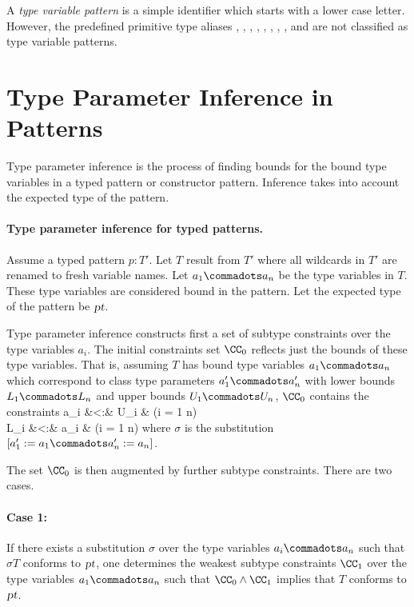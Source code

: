A {\em type variable pattern} is a simple identifier which starts with
a lower case letter. However, the predefined primitive type aliases
\lstinline@unit@, \lstinline@boolean@, \lstinline@byte@,
\lstinline@short@, \lstinline@char@, \lstinline@int@,
\lstinline@long@, \lstinline@float@, and \lstinline@double@ are not
classified as type variable patterns.

\section{Type Parameter Inference in Patterns}\label{sec:type-param-inf-pat}

Type parameter inference is the process of finding bounds for the
bound type variables in a typed pattern or constructor
pattern. Inference takes into account the expected type of the
pattern.

\paragraph{Type parameter inference for typed patterns.}
Assume a typed pattern $p: T'$. Let $T$ result from $T'$ where all wildcards in
$T'$ are renamed to fresh variable names.  Let $a_1 \commadots a_n$ be
the type variables in $T$. These type variables are considered bound
in the pattern. Let the expected type of the pattern be $\mbox{\sl pt}$.

Type parameter inference constructs first a set of subtype constraints over
the type variables $a_i$. The initial constraints set $\CC_0$ reflects
just the bounds of these type variables. That is, assuming $T$ has
bound type variables $a_1 \commadots a_n$ which correspond to class
type parameters $a'_1 \commadots a'_n$ with lower bounds $L_1
\commadots L_n$ and upper bounds $U_1 \commadots U_n$, $\CC_0$
contains the constraints  a_i &<:& \sigma U_i & \gap (i = 1
\commadots n)\\ \sigma L_i &<:& a_i & \gap (i = 1 \commadots n) \eda
where $\sigma$ is the substitution $[a'_1 := a_1 \commadots a'_n :=
a_n]$.

The set $\CC_0$ is then augmented by further subtype constraints. There are two
cases.

\paragraph{Case 1:}
If there exists a substitution $\sigma$ over the type variables $a_i
\commadots a_n$ such that $\sigma T$ conforms to $\mbox{\sl pt}$, one determines
the weakest subtype constraints $\CC_1$ over the type variables $a_1
\commadots a_n$ such that $\CC_0 \wedge \CC_1$ implies that $T$
conforms to $\mbox{\sl pt}$.

